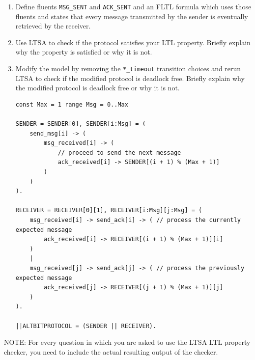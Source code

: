 \documentclass{article}
\begin{document}
\begin{enumerate}
\begin{enumerate}
\item Define fluents \verb"MSG_SENT" and \verb"ACK_SENT" and an FLTL
formula which uses those fluents and states that every message
transmitted by the sender is eventually retrieved by the receiver.

\item Use LTSA to check if the protocol satisfies your LTL property. Briefly explain why the property is satisfied or why it is not.

\item Modify the model by removing the \verb"*_timeout" transition
choices and rerun LTSA to check if the modified protocol is deadlock
free. Briefly explain why the modified protocol is deadlock free or why it is not.
\begin{verbatim}
const Max = 1 range Msg = 0..Max

SENDER = SENDER[0], SENDER[i:Msg] = (
    send_msg[i] -> (
        msg_received[i] -> (
            // proceed to send the next message
            ack_received[i] -> SENDER[(i + 1) % (Max + 1)]
        )
    )
).

RECEIVER = RECEIVER[0][1], RECEIVER[i:Msg][j:Msg] = (
    msg_received[i] -> send_ack[i] -> ( // process the currently expected message
        ack_received[i] -> RECEIVER[(i + 1) % (Max + 1)][i]
    )
    |
    msg_received[j] -> send_ack[j] -> ( // process the previously expected message
        ack_received[j] -> RECEIVER[(j + 1) % (Max + 1)][j]
    )
).

||ALTBITPROTOCOL = (SENDER || RECEIVER).
\end{verbatim}
\end{enumerate}
NOTE: For every question in which you are asked to use the LTSA LTL
property checker, you need to include the actual resulting output of
the checker.

\end{enumerate}
\end{document}
